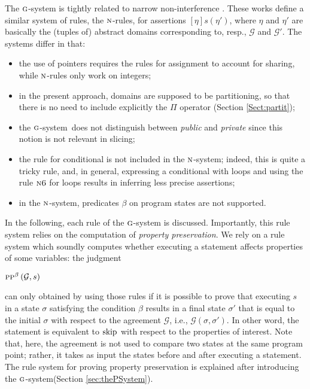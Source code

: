 \documentclass[prodmode,acmtocl]{acmsmall}
\def\state{\ensuremath{\sigma}\xspace}
\newcommand{\NANI}[3]{\left[#1\right]#2\left(#3\right)}
\newcommand{\0}{\mbox{\bf 0}}
\newcommand{\CODE}[1]{\ensuremath{\mbox{\lstinline!#1!}\xspace}\xspace}
\def\PRED{\beta}
\def\AGREEM{\mathcal{G}}
\newcommand{\RULENAME}[1]{\textsc{#1}}
\newcommand{\GSMTH}[1]{$\RULENAME{g}$-#1}
\def\GSYSTEM{\GSMTH{system}\xspace}
\newcommand{\PRESERVESB}[3]{\textsc{pp}^{#1}\left(#3,#2\right)}
\begin{document}
The \GSYSTEM is tightly related to narrow non-interference
\cite{GM04popl,GM04CSL}.  These works define a similar system of
rules, the $\RULENAME{n}$-rules, for assertions
$\NANI{\eta}{s}{\eta'}$, where $\eta$ and $\eta'$ are basically the
(tuples of) abstract domains corresponding to, resp., $\AGREEM$ and
$\AGREEM'$.  The systems differ in that:
\begin{itemize}
\item the use of pointers requires the rules for assignment to account
  for sharing, while $\RULENAME{n}$-rules only work on integers;
\item in the present approach, domains are supposed to be
  partitioning, so that there is no need to include explicitly the
  $\Pi$ operator (Section \ref{Sect:partit});
\item the \GSYSTEM~does not distinguish between \emph{public} and
  \emph{private} since this notion is not relevant in slicing;
\item the rule for conditional is not included in the
  $\RULENAME{n}$-system; indeed, this is quite a tricky rule, and, in
  general, expressing a conditional with loops and using the rule
  $\RULENAME{n6}$ for loops results in inferring less precise
  assertions;
\item in the $\RULENAME{n}$-system, predicates $\PRED$ on program
  states are not supported.
\end{itemize}

In the following, each rule of the \GSYSTEM is discussed.
Importantly, this rule system relies on the computation of
\emph{property preservation}.  We rely on a rule system which soundly
computes whether executing a statement affects properties of some
variables: the judgment

\centerline{$\PRESERVESB{\PRED}{s}{\AGREEM}$}
\noindent can only obtained by using those rules if it is possible to
prove that executing $s$ in a state $\state$ satisfying the condition
$\PRED$ results in a final state $\state'$ that is equal to the
initial $\state$ with respect to the agreement $\AGREEM$, i.e.,
$\AGREEM(\state,\state')$.  In other word, the statement is equivalent
to \CODE{skip} with respect to the properties of interest.  Note that,
here, the agreement is not used to compare two states at the same
program point; rather, it takes as input the states before and after
executing a statement.  The rule system for proving property
preservation is explained after introducing the \GSYSTEM (Section
\ref{sec:thePSystem}).
\end{document}
